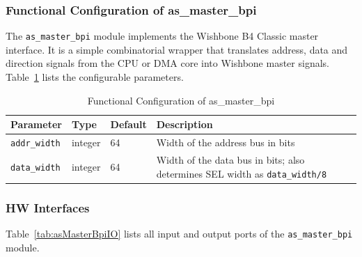 \subsubsection{Functional Configuration of as\_master\_bpi}

The \texttt{as\_master\_bpi} module implements the Wishbone B4 Classic
master interface.
It is a simple combinatorial wrapper that translates address, data and
direction signals from the CPU or DMA core into Wishbone master signals.
Table~\ref{tab:asMasterBpiCfg} lists the configurable parameters.

\begin{table}[H]
\caption{Functional Configuration of as\_master\_bpi}
\label{tab:asMasterBpiCfg}
\centering
\begin{tabularx}{\textwidth}{|l |l |l |X|}
  \hline
  Parameter & Type & Default & Description \\
  \hline
  \hline
  \texttt{addr\_width} & integer & 64 & Width of the address bus in bits \\
  \hline
  \texttt{data\_width} & integer & 64 & Width of the data bus in bits; also determines SEL width as \texttt{data\_width/8} \\
  \hline
\end{tabularx}
\end{table}

\subsubsection{HW Interfaces}

Table~\ref{tab:asMasterBpiIO} lists all input and output ports of the
\texttt{as\_master\_bpi} module.

